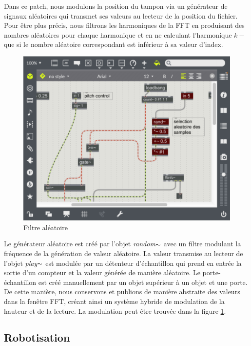     Dans ce patch, nous modulons la position du tampon via un générateur de signaux aléatoires qui transmet ses valeurs au lecteur de la position du fichier. Pour être plus précis, nous filtrons les harmoniques de la FFT en produisant des nombres aléatoires pour chaque harmonique et en ne calculant l'harmonique $ k-$ que si le nombre aléatoire correspondant est inférieur à sa valeur d'index.
    
    \begin{figure}
        \centering
        \includegraphics[width = 0.4 \textwidth ]{Graphs/random_sampling.png}
        \caption{Filtre aléatoire}
        \label{FiltreAleatoire}
    \end{figure}


    Le générateur aléatoire est créé par l'objet \textit{random$\thicksim $} avec un filtre modulant la fréquence de la génération de valeur aléatoire. La valeur transmise au lecteur de l'objet \textit{play$\thicksim $} est modulée par un détenteur d'échantillon qui prend en entrée la sortie d'un compteur et la valeur générée de manière aléatoire. Le porte-échantillon est créé manuellement par un objet supérieur à un objet et une porte. De cette manière, nous conservons et publions de manière abstraite des valeurs dans la fenêtre FFT, créant ainsi un système hybride de modulation de la hauteur et de la lecture. La modulation peut être trouvée dans la figure \ref{FiltreAleatoire}.

\subsection{Robotisation}
    
